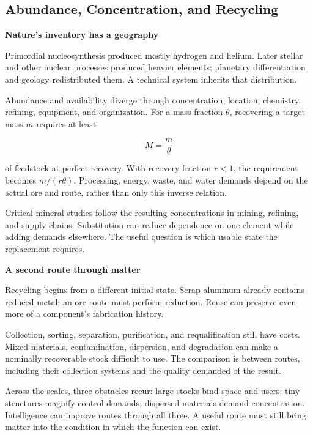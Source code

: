 \documentclass[11pt,openany]{book}
\newcommand{\subhead}[1]{\par\medskip\noindent\textbf{#1}\par\nobreak\smallskip}
\begin{document}
\subsection{Abundance, Concentration, and Recycling}

\subhead{Nature's inventory has a geography}

Primordial nucleosynthesis produced mostly hydrogen and helium. Later stellar and other nuclear processes produced heavier elements; planetary differentiation and geology redistributed them.\cite{steigman2007primordial,alpher1948origin,rudnick2003composition} A technical system inherits that distribution.

Abundance and availability diverge through concentration, location, chemistry, refining, equipment, and organization. For a mass fraction $\theta$, recovering a target mass $m$ requires at least

\begin{equation}
M=\frac{m}{\theta}
\end{equation}

of feedstock at perfect recovery. With recovery fraction $r<1$, the requirement becomes $m/(r\theta)$. Processing, energy, waste, and water demands depend on the actual ore and route, rather than only this inverse relation.

Critical-mineral studies follow the resulting concentrations in mining, refining, and supply chains.\cite{iea2021criticalminerals} Substitution can reduce dependence on one element while adding demands elsewhere. The useful question is which usable state the replacement requires.

\subhead{A second route through matter}

Recycling begins from a different initial state. Scrap aluminum already contains reduced metal; an ore route must perform reduction. Reuse can preserve even more of a component's fabrication history.

Collection, sorting, separation, purification, and requalification still have costs. Mixed materials, contamination, dispersion, and degradation can make a nominally recoverable stock difficult to use. The comparison is between routes, including their collection systems and the quality demanded of the result.

Across the scales, three obstacles recur: large stocks bind space and users; tiny structures magnify control demands; dispersed materials demand concentration. Intelligence can improve routes through all three. A useful route must still bring matter into the condition in which the function can exist.
\end{document}
